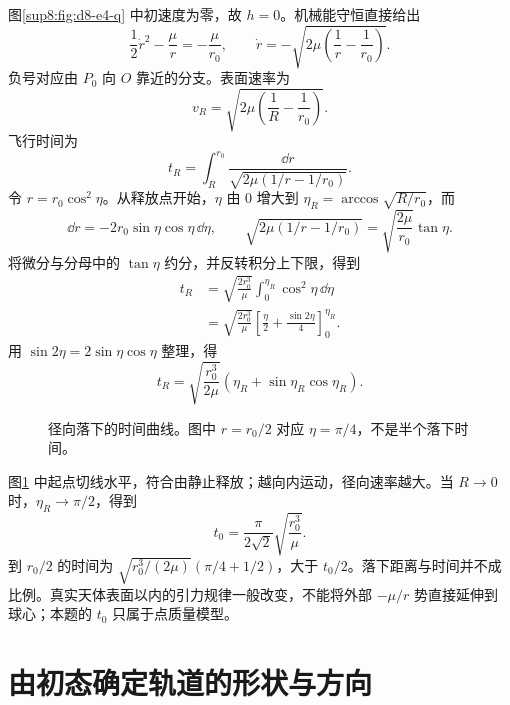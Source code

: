 \begin{solution}
图\ref{sup8:fig:d8-e4-q} 中初速度为零，故 $h=0$。机械能守恒直接给出
\[
 \frac12\dot r^2-\frac\mu r=-\frac\mu{r_0},\qquad
 \dot r=-\sqrt{2\mu\left(\frac1r-\frac1{r_0}\right)}.
\]
负号对应由 $P_0$ 向 $O$ 靠近的分支。表面速率为
\[
 v_R=\sqrt{2\mu\left(\frac1R-\frac1{r_0}\right)}.
\]
飞行时间为
\[
 t_R=\int_R^{r_0}\frac{\dd r}{\sqrt{2\mu(1/r-1/r_0)}}.
\]
令 $r=r_0\cos^2\eta$。从释放点开始，$\eta$ 由 $0$ 增大到 $\eta_R=\arccos\sqrt{R/r_0}$，而
\[
 \dd r=-2r_0\sin\eta\cos\eta\,\dd\eta,\qquad
 \sqrt{2\mu(1/r-1/r_0)}=\sqrt{\frac{2\mu}{r_0}}\tan\eta.
\]
将微分与分母中的 $\tan\eta$ 约分，并反转积分上下限，得到
\[
\begin{aligned}
t_R&=\sqrt{\frac{2r_0^3}{\mu}}\int_0^{\eta_R}\cos^2\eta\,\dd\eta\\
&=\sqrt{\frac{2r_0^3}{\mu}}\left[\frac\eta2+\frac{\sin2\eta}{4}\right]_0^{\eta_R}.
\end{aligned}
\]
用 $\sin2\eta=2\sin\eta\cos\eta$ 整理，得
\begin{equation}
 \boxed{t_R=\sqrt{\frac{r_0^3}{2\mu}}
   \left(\eta_R+\sin\eta_R\cos\eta_R\right)}.
\end{equation}
\begin{figure}[H]\centering
{}
\caption{径向落下的时间曲线。图中 $r=r_0/2$ 对应 $\eta=\pi/4$，不是半个落下时间。}\label{sup8:fig:d8-e4-s}
\end{figure}
图\ref{sup8:fig:d8-e4-s} 中起点切线水平，符合由静止释放；越向内运动，径向速率越大。当 $R\to0$ 时，$\eta_R\to\pi/2$，得到
\[
 t_0=\frac\pi{2\sqrt2}\sqrt{\frac{r_0^3}{\mu}}.
\]
到 $r_0/2$ 的时间为 $\sqrt{r_0^3/(2\mu)}(\pi/4+1/2)$，大于 $t_0/2$。落下距离与时间并不成比例。真实天体表面以内的引力规律一般改变，不能将外部 $-\mu/r$ 势直接延伸到球心；本题的 $t_0$ 只属于点质量模型。
\end{solution}



\section{由初态确定轨道的形状与方向}

